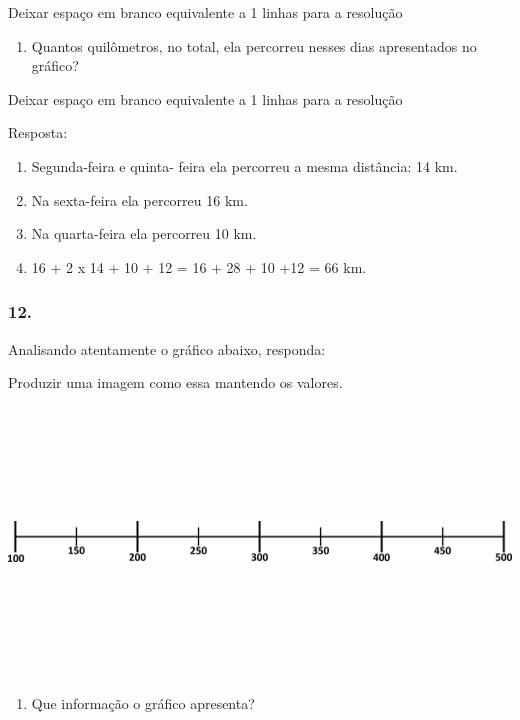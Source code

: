 Deixar espaço em branco equivalente a 1 linhas para a resolução

\begin{enumerate}
\def\labelenumi{\alph{enumi})}
\item
  Quantos quilômetros, no total, ela percorreu nesses dias apresentados
  no gráfico?
\end{enumerate}

Deixar espaço em branco equivalente a 1 linhas para a resolução

Resposta:

\begin{enumerate}
\def\labelenumi{\alph{enumi})}
\item
  Segunda-feira e quinta- feira ela percorreu a mesma distância: 14 km.
\item
  Na sexta-feira ela percorreu 16 km.
\item
  Na quarta-feira ela percorreu 10 km.
\item
  16 + 2 x 14 + 10 + 12 = 16 + 28 + 10 +12 = 66 km.
\end{enumerate}

\subsubsection{12.}\label{section-118}

Analisando atentamente o gráfico abaixo, responda:

Produzir uma imagem como essa mantendo os valores.

\includegraphics[width=5.90556in,height=2.79931in]{media/image102.png}

\begin{enumerate}
\def\labelenumi{\alph{enumi})}
\item
  Que informação o gráfico apresenta?
\end{enumerate}


